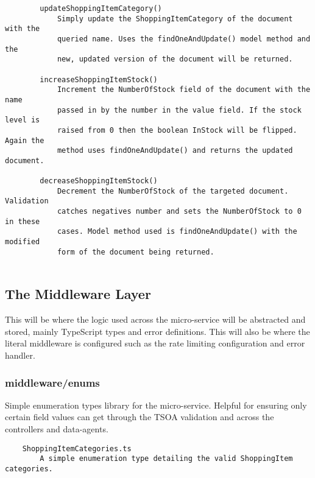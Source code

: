 \begin{verbatim}
        updateShoppingItemCategory()
            Simply update the ShoppingItemCategory of the document with the
            queried name. Uses the findOneAndUpdate() model method and the
            new, updated version of the document will be returned.
        
        increaseShoppingItemStock()
            Increment the NumberOfStock field of the document with the name
            passed in by the number in the value field. If the stock level is
            raised from 0 then the boolean InStock will be flipped. Again the
            method uses findOneAndUpdate() and returns the updated document.
            
        decreaseShoppingItemStock()
            Decrement the NumberOfStock of the targeted document. Validation
            catches negatives number and sets the NumberOfStock to 0 in these
            cases. Model method used is findOneAndUpdate() with the modified 
            form of the document being returned.
        
\end{verbatim}
\subsection{The Middleware Layer}
This will be where the logic used across the micro-service will be abstracted and stored, mainly TypeScript types and error definitions. This will also be where the literal middleware is configured such as the rate limiting configuration and error handler.
\subsubsection{middleware/enums}
Simple enumeration types library for the micro-service. Helpful for ensuring only certain field values can get through the TSOA validation and across the controllers and data-agents.
\begin{verbatim}
    ShoppingItemCategories.ts
        A simple enumeration type detailing the valid ShoppingItem categories.
\end{verbatim}
